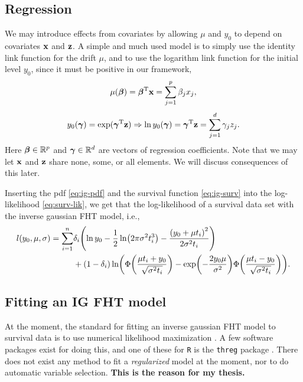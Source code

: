 \subsection{Regression}
We may introduce effects from covariates by allowing $\mu$ and $y_0$ to depend on covariates $\mathbf{x}$ and $\mathbf{z}$. A simple and much used model is to simply use the identity link function for the drift $\mu$, and to use the logarithm link function for the initial level $y_0$, since it must be positive in our framework,
\begin{equation}\label{eq:y0}
    \mu(\boldsymbol{\beta})=\boldsymbol{\beta}^{\text{T}}\mathbf{x}=\sum_{j=1}^p \beta_jx_j,
\end{equation}
\begin{equation}\label{eq:mu}
    y_0(\boldsymbol{\gamma})=\exp(\boldsymbol{\gamma}^{\text{T}}\mathbf{z})\Rightarrow\ln y_0(\boldsymbol{\gamma})=\boldsymbol{\gamma}^{\text{T}}\mathbf{z}=\sum_{j=1}^d \gamma_jz_j.
\end{equation}
Here $\boldsymbol{\beta}\in\mathbb{R}^p$ and $\boldsymbol{\gamma}\in\mathbb{R}^d$ are vectors of regression coefficients. Note that we may let $\mathbf{x}$ and $\mathbf{z}$ share none, some, or all elements. We will discuss consequences of this later.

Inserting the pdf \eqref{eq:ig-pdf} and the survival function \eqref{eq:ig-surv} into the log-likelihood \eqref{eq:surv-lik}, we get that the log-likelihood of a survival data set with the inverse gaussian FHT model, i.e.,
\begin{align}\label{eq:loglik}
\begin{split}
    l(y_0,\mu,\sigma)=\sum_{i=1}^n&\di\p*{\ln y_0-\frac{1}{2}\ln\p*{2\pi\sigma^2\ti^3}-\frac{\p*{y_0+\mu\ti}^2}{2\sigma^2\ti}} \\
    &+
    (1-\di)\ln\p*{\Phi\p*{\frac{\mu\ti+y_0}{\sqrt{\sigma^2\ti}}}-\exp\p*{-\frac{2y_0\mu}{\sigma^2}}\Phi\p*{\frac{\mu\ti-y_0}{\sqrt{\sigma^2\ti}}}}.
\end{split}
\end{align}

\subsection{Fitting an IG FHT model}
At the moment, the standard for fitting an inverse gaussian FHT model to survival data is to use numerical likelihood maximization \citep{caroni2017}. A few software packages exist for doing this, and one of these for \verb|R| \citep{Rlang} is the \verb|threg| package \citep{threg}. There does not exist any method to fit a \textit{regularized} model at the moment, nor to do automatic variable selection. \textbf{This is the reason for my thesis.}



